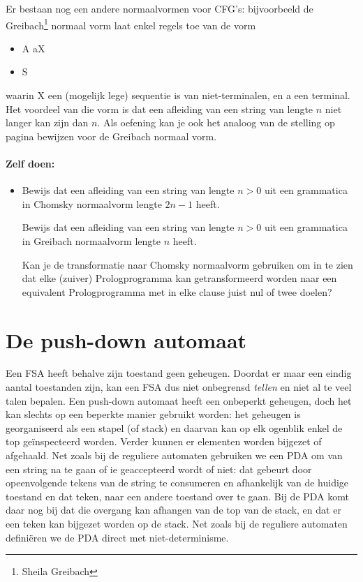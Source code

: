 Er bestaan nog een andere normaalvormen voor CFG's: bijvoorbeeld de
Greibach\footnote{Sheila Greibach} normaal vorm laat enkel regels toe
van de vorm
\begin{itemize}
\item A \rpijl aX
\item S \rpijl \eps
\end{itemize}
waarin X een (mogelijk lege) sequentie is van niet-terminalen, en a
een terminal. Het voordeel van die vorm is dat een afleiding van een
string van lengte $n$ niet langer kan zijn dan $n$. Als
oefening kan je ook het analoog van de stelling op pagina
\pageref{chomskynormalform} bewijzen voor de Greibach normaal vorm.

\paragraph{Zelf doen:}
\begin{itemize}
\item[]
Bewijs dat een afleiding van een string van lengte $n > 0$ uit een
grammatica in Chomsky normaalvorm lengte $2n-1$ heeft.

Bewijs dat een afleiding van een string van lengte $n > 0$ uit een
grammatica in Greibach normaalvorm lengte $n$ heeft.

Kan je de transformatie naar Chomsky normaalvorm gebruiken om in te
zien dat elke (zuiver) Prologprogramma kan getransformeerd worden naar
een equivalent Prologprogramma met in elke clause juist nul of twee
doelen?
\end{itemize}


\clearpage
\section{De push-down automaat}

Een FSA heeft behalve zijn toestand geen geheugen. Doordat er maar een
eindig aantal toestanden zijn, kan een FSA dus niet onbegrensd {\em
tellen} en niet al te veel talen bepalen. Een push-down automaat heeft
een onbeperkt geheugen, doch het kan slechts op een beperkte manier
gebruikt worden: het geheugen is georganiseerd als een stapel (of
stack) en daarvan kan op elk ogenblik enkel de top ge\"{i}nspecteerd
worden. Verder kunnen er elementen worden bijgezet of afgehaald. Net
zoals bij de reguliere automaten gebruiken we een PDA om van een
string na te gaan of ie geaccepteerd wordt of niet: dat gebeurt door
opeenvolgende tekens van de string te consumeren en afhankelijk van de
huidige toestand en dat teken, naar een andere toestand over te
gaan. Bij de PDA komt daar nog bij dat die overgang kan afhangen van
de top van de stack, en dat er een teken kan bijgezet worden op de
stack. Net zoals bij de reguliere automaten defini\"eren we de PDA
direct met niet-determinisme.


